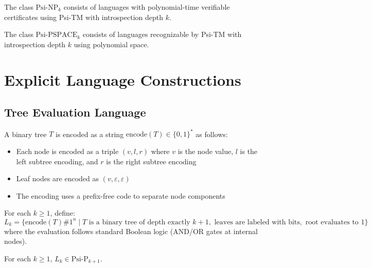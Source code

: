 \begin{definition}
The class $\text{Psi-NP}_k$ consists of languages with polynomial-time verifiable certificates using Psi-TM with introspection depth $k$.
\end{definition}

\begin{definition}
The class $\text{Psi-PSPACE}_k$ consists of languages recognizable by Psi-TM with introspection depth $k$ using polynomial space.
\end{definition}

\section{Explicit Language Constructions}

\subsection{Tree Evaluation Language}

\begin{definition}
A binary tree $T$ is encoded as a string $\text{encode}(T) \in \{0,1\}^*$ as follows:
\begin{itemize}
\item Each node is encoded as a triple $(v, l, r)$ where $v$ is the node value, $l$ is the left subtree encoding, and $r$ is the right subtree encoding
\item Leaf nodes are encoded as $(v, \varepsilon, \varepsilon)$
\item The encoding uses a prefix-free code to separate node components
\end{itemize}
\end{definition}

\begin{definition}
For each $k \geq 1$, define:
$$L_k = \{\text{encode}(T)\#1^n \mid T \text{ is a binary tree of depth exactly } k+1, \text{ leaves are labeled with bits}, \text{ root evaluates to } 1\}$$
where the evaluation follows standard Boolean logic (AND/OR gates at internal nodes).
\end{definition}

\begin{claim}
For each $k \geq 1$, $L_k \in \text{Psi-P}_{k+1}$.
\end{claim}

